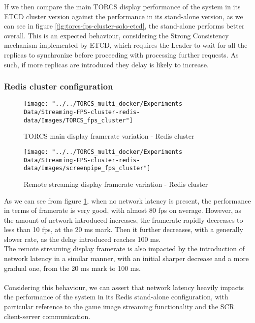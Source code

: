 If we then compare the main TORCS display performance of the system in its ETCD cluster version against the performance in its stand-alone version, as we can see in figure \ref{fig:torcs-fps-cluster-solo-etcd}, the stand-alone performs better overall. This is an expected behaviour, considering the Strong Consistency mechanism implemented by ETCD, which requires the Leader to wait for all the replicas to synchronize before proceeding with processing further requests. As such, if more replicas are introduced they delay is likely to increase.

\subsubsection{Redis cluster configuration}
\begin{figure}[h!]
	\centering
	\texttt{[image: "../../TORCS\_multi\_docker/Experiments Data/Streaming-FPS-cluster-redis-data/Images/TORCS\_fps\_cluster"]}
	\caption[TORCS main display framerate variation - Redis cluster]{TORCS main display framerate variation - Redis cluster}
	\label{fig:torcs-merged-fps-redis-cluster}
\end{figure}
\begin{figure}[h!]
	\centering
	\texttt{[image: "../../TORCS\_multi\_docker/Experiments Data/Streaming-FPS-cluster-redis-data/Images/screenpipe\_fps\_cluster"]}
	\caption[Remote streaming display framerate variation - Redis cluster]{Remote streaming display framerate variation - Redis cluster}
	\label{fig:screenpipe-merged-fps-redis-cluster}
\end{figure}
As we can see from figure \ref{fig:torcs-merged-fps-redis-cluster}, when no network latency is present, the performance in terms of framerate is very good, with almost 80 fps on average. However, as the amount of network introduced increases, the framerate rapidly decreases to less than 10 fps, at the 20 ms mark. Then it further decreases, with a generally slower rate, as the delay introduced reaches 100 ms. \\
The remote streaming display framerate is also impacted by the introduction of network latency in a similar manner, with an initial sharper decrease and a more gradual one, from the 20 ms mark to 100 ms. \\ \\
Considering this behaviour, we can assert that network latency heavily impacts the performance of the system in its Redis stand-alone configuration, with particular reference to the game image streaming functionality and the SCR client-server communication. \\ \\
